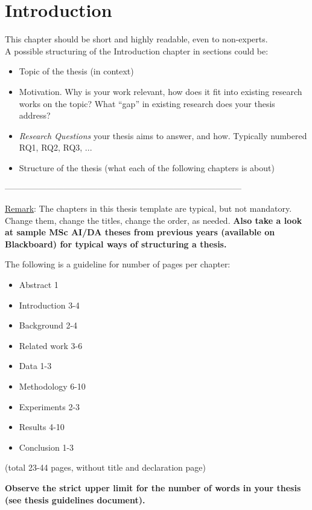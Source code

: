 \documentclass[a4paper,12pt]{Classes/RoboticsLaTeX}
\begin{document}
	
	\chapter{Introduction}
	\label{chap:introduction}
	
	This chapter should be short and highly readable, even to non-experts.\\
	
	\noindent A possible structuring of the Introduction chapter in sections could be:
	\begin{itemize}
		\item Topic of the thesis (in context)
		\item Motivation. Why is your work relevant, how does it fit into existing research works on the topic? What ``gap'' in existing research does your thesis address?
		\item \textit{Research Questions} your thesis aims to answer, and how. Typically numbered RQ1, RQ2, RQ3, ...
		\item Structure of the thesis (what each of the following chapters is about)
	\end{itemize}
	
	
	------------------------------------------------------------------------------------
	
	\underline{Remark}: The chapters in this thesis template are typical, but not mandatory. Change them, change the titles, change the order, as needed. \textbf{Also take a look at sample MSc AI/DA theses from previous years (available on Blackboard) for typical ways of structuring a thesis.}
	
	The following is a guideline for number of pages per chapter:
	
	\begin{itemize}
		\item Abstract 1 
		\item Introduction 3-4
		\item Background 2-4
		\item Related work 3-6
		\item Data 1-3
		\item Methodology 6-10
		\item Experiments 2-3
		\item Results 4-10
		\item Conclusion 1-3
	\end{itemize}
	
	(total 23-44 pages, without title and declaration page)
	
	\textbf{Observe the strict upper limit for the number of words in your thesis (see thesis guidelines document).}
	
\end{document}
